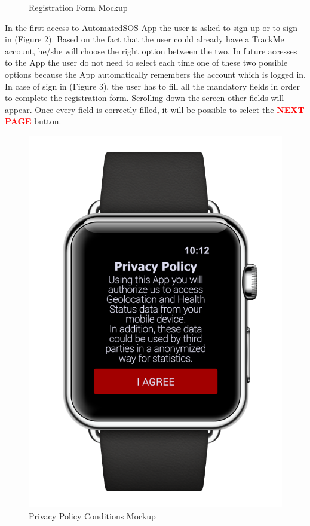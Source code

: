 \begin{enumerate}
\begin{figure}[H]
\begin{center}
\begin{minipage}[c]{.40\textwidth}
          	\caption{Registration Form Mockup}
        \end{minipage}
      \end{center}
\end{figure}
In the first access to AutomatedSOS App the user is asked to sign up or to sign in 			(Figure 2). Based on the fact that the user could already have a TrackMe account, he/she will choose the right option between the two. In future accesses to the App the user do not need to select each time one of these two possible options because the App automatically remembers the account which is logged in. In case of sign in (Figure 3), the user has to fill all the mandatory fields in order to complete the registration form. Scrolling down the screen other fields will appear. Once every field is correctly filled, it will be possible to select the {\textcolor{Red}{\textbf{NEXT PAGE}}} button. 
\clearpage
\begin{figure}[H]
\begin{center}
        \begin{minipage}[c]{.40\textwidth}
        \centering
          \includegraphics[height=12 cm]{Images/Mockups/AutomatedSOSMockup2.png}
             	\caption{Privacy Policy Conditions Mockup}
        \end{minipage}%
        \hspace{10mm}%
        \begin{minipage}[c]{.40\textwidth}
        \centering

\end{minipage}
\end{center}
\end{figure}
\end{enumerate}
